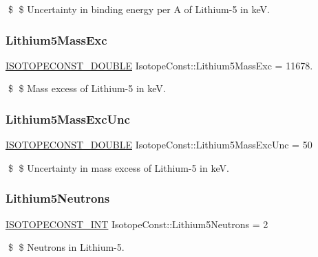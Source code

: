 \$ \$ Uncertainty in binding energy per A of Lithium-\/5 in keV. \mbox{\label{group___isotope_const-_lithium-_li5_ga943a502e514dded7af0b9bc24c1c82c1}} 
\subsubsection{\texorpdfstring{Lithium5\+Mass\+Exc}{Lithium5MassExc}}
{\footnotesize\ttfamily \mbox{\hyperlink{group___isotope_const-_macros_ga8f45a7272ce02c0b4c65c44636ed719a}{I\+S\+O\+T\+O\+P\+E\+C\+O\+N\+S\+T\+\_\+\+D\+O\+U\+B\+LE}} Isotope\+Const\+::\+Lithium5\+Mass\+Exc = 11678.}

\$ \$ Mass excess of Lithium-\/5 in keV. \mbox{\label{group___isotope_const-_lithium-_li5_ga92845a7b1d2bfe89b461e90bd1779b16}} 
\subsubsection{\texorpdfstring{Lithium5\+Mass\+Exc\+Unc}{Lithium5MassExcUnc}}
{\footnotesize\ttfamily \mbox{\hyperlink{group___isotope_const-_macros_ga8f45a7272ce02c0b4c65c44636ed719a}{I\+S\+O\+T\+O\+P\+E\+C\+O\+N\+S\+T\+\_\+\+D\+O\+U\+B\+LE}} Isotope\+Const\+::\+Lithium5\+Mass\+Exc\+Unc = 50}

\$ \$ Uncertainty in mass excess of Lithium-\/5 in keV. \mbox{\label{group___isotope_const-_lithium-_li5_ga35ffccf3108488535d0b89e600db3538}} 
\subsubsection{\texorpdfstring{Lithium5\+Neutrons}{Lithium5Neutrons}}
{\footnotesize\ttfamily \mbox{\hyperlink{group___isotope_const-_macros_ga5f18360b3e99483a35c32d789e62621c}{I\+S\+O\+T\+O\+P\+E\+C\+O\+N\+S\+T\+\_\+\+I\+NT}} Isotope\+Const\+::\+Lithium5\+Neutrons = 2}

\$ \$ Neutrons in Lithium-\/5. \mbox{\label{group___isotope_const-_lithium-_li5_ga91e3ea35651db8f9a9814d73e5894fd5}} 
